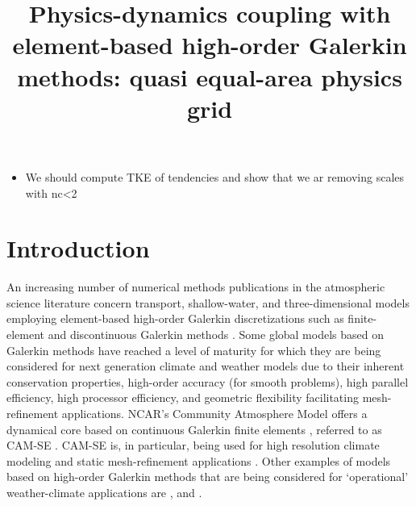 \documentclass[twocol]{ametsoc}
\title{Physics-dynamics coupling with element-based high-order Galerkin methods: quasi equal-area physics grid}
\affiliation{School of Marine and Atmospheric Sciences, Stony Brook University, State University of New York, Stony Brook, New York.}
\begin{document}
\maketitle


%

\begin{itemize}
\item We should compute TKE of tendencies and show that we ar removing scales with nc<2
\end{itemize}
\section{Introduction}
An increasing number of numerical methods publications in the atmospheric science literature concern transport, shallow-water, and three-dimensional models employing element-based high-order Galerkin discretizations such as finite-element and discontinuous Galerkin methods \citep[for an introduction to these methods see, e.g., ][]{Durran,NLL2011LNCSE}. Some global models based on Galerkin methods have reached a level of maturity for which they are being considered for next generation climate and weather models due to their inherent conservation properties, high-order accuracy (for smooth problems), high parallel efficiency, high processor efficiency, and geometric flexibility facilitating mesh-refinement applications. NCAR's Community Atmosphere Model \citep[CAM; ][]{CAM5} offers a dynamical core based on continuous Galerkin finite elements \citep{TF2010JCP}, referred to as CAM-SE \citep[CAM Spectral Elements; ][]{DetAl2012IJHPCA,TES2008JPCS.LetAl2017MWR}. CAM-SE is, in particular, being used for high resolution climate modeling \citep[e.g., ][]{JAME:JAME20125,BetAl2013JC,RetAl2015GRL} and static mesh-refinement applications \citep[e.g., ][]{FT2004MWR,ZetAl2014JC,ZetAl2014JCb,GetAl2014GMD,RHUZ2016}. Other examples of models based on high-order Galerkin methods that are being considered for `operational' weather-climate applications are \citet{Giraldo20083849}, \citet{NCT2009CF} and \citet{BSBDK2013TCFD}.
\end{document}
